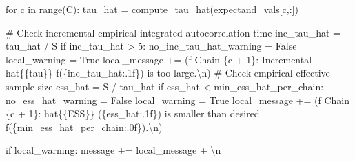 \documentclass[
  letterpaper,
  DIV=11,
  numbers=noendperiod]{scrartcl}
\newenvironment{Shaded}{\begin{snugshade}}{\end{snugshade}}
\newcommand{\BuiltInTok}[1]{\textcolor[rgb]{0.00,0.23,0.31}{#1}}
\newcommand{\CharTok}[1]{\textcolor[rgb]{0.13,0.47,0.30}{#1}}
\newcommand{\CommentTok}[1]{\textcolor[rgb]{0.37,0.37,0.37}{#1}}
\newcommand{\ControlFlowTok}[1]{\textcolor[rgb]{0.00,0.23,0.31}{#1}}
\newcommand{\DecValTok}[1]{\textcolor[rgb]{0.68,0.00,0.00}{#1}}
\newcommand{\KeywordTok}[1]{\textcolor[rgb]{0.00,0.23,0.31}{#1}}
\newcommand{\NormalTok}[1]{\textcolor[rgb]{0.00,0.23,0.31}{#1}}
\newcommand{\OperatorTok}[1]{\textcolor[rgb]{0.37,0.37,0.37}{#1}}
\newcommand{\SpecialCharTok}[1]{\textcolor[rgb]{0.37,0.37,0.37}{#1}}
\newcommand{\SpecialStringTok}[1]{\textcolor[rgb]{0.13,0.47,0.30}{#1}}
\newcommand{\StringTok}[1]{\textcolor[rgb]{0.13,0.47,0.30}{#1}}
\newcommand{\VariableTok}[1]{\textcolor[rgb]{0.07,0.07,0.07}{#1}}
\begin{document}
\begin{Shaded}
\begin{Highlighting}[]
    \ControlFlowTok{for}\NormalTok{ c }\KeywordTok{in} \BuiltInTok{range}\NormalTok{(C):}
\NormalTok{      tau\_hat }\OperatorTok{=}\NormalTok{ compute\_tau\_hat(expectand\_vals[c,:])}

      \CommentTok{\# Check incremental empirical integrated autocorrelation time}
\NormalTok{      inc\_tau\_hat }\OperatorTok{=}\NormalTok{ tau\_hat }\OperatorTok{/}\NormalTok{ S}
      \ControlFlowTok{if}\NormalTok{ inc\_tau\_hat }\OperatorTok{\textgreater{}} \DecValTok{5}\NormalTok{:}
\NormalTok{        no\_inc\_tau\_hat\_warning }\OperatorTok{=} \VariableTok{False}
\NormalTok{        local\_warning }\OperatorTok{=} \VariableTok{True}
\NormalTok{        local\_message }\OperatorTok{+=}\NormalTok{ (}\SpecialStringTok{f\textquotesingle{}  Chain }\SpecialCharTok{\{}\NormalTok{c }\OperatorTok{+} \DecValTok{1}\SpecialCharTok{\}}\SpecialStringTok{: Incremental hat}\CharTok{\{\{}\SpecialStringTok{tau}\CharTok{\}\}}\SpecialStringTok{ \textquotesingle{}}
                          \SpecialStringTok{f\textquotesingle{}(}\SpecialCharTok{\{}\NormalTok{inc\_tau\_hat}\SpecialCharTok{:.1f\}}\SpecialStringTok{) is too large.}\CharTok{\textbackslash{}n}\SpecialStringTok{\textquotesingle{}}\NormalTok{)}
      \CommentTok{\# Check empirical effective sample size}
\NormalTok{      ess\_hat }\OperatorTok{=}\NormalTok{ S }\OperatorTok{/}\NormalTok{ tau\_hat}
      \ControlFlowTok{if}\NormalTok{ ess\_hat }\OperatorTok{\textless{}}\NormalTok{ min\_ess\_hat\_per\_chain:}
\NormalTok{        no\_ess\_hat\_warning }\OperatorTok{=} \VariableTok{False}
\NormalTok{        local\_warning }\OperatorTok{=} \VariableTok{True}
\NormalTok{        local\_message }\OperatorTok{+=}\NormalTok{ (}\SpecialStringTok{f\textquotesingle{}  Chain }\SpecialCharTok{\{}\NormalTok{c }\OperatorTok{+} \DecValTok{1}\SpecialCharTok{\}}\SpecialStringTok{: hat}\CharTok{\{\{}\SpecialStringTok{ESS}\CharTok{\}\}}\SpecialStringTok{ (}\SpecialCharTok{\{}\NormalTok{ess\_hat}\SpecialCharTok{:.1f\}}\SpecialStringTok{) \textquotesingle{}}
                          \StringTok{\textquotesingle{}is smaller than desired \textquotesingle{}}
                          \SpecialStringTok{f\textquotesingle{}(}\SpecialCharTok{\{}\NormalTok{min\_ess\_hat\_per\_chain}\SpecialCharTok{:.0f\}}\SpecialStringTok{).}\CharTok{\textbackslash{}n}\SpecialStringTok{\textquotesingle{}}\NormalTok{)}
    
    \ControlFlowTok{if}\NormalTok{ local\_warning:}
\NormalTok{      message }\OperatorTok{+=}\NormalTok{ local\_message }\OperatorTok{+} \StringTok{\textquotesingle{}}\CharTok{\textbackslash{}n}\StringTok{\textquotesingle{}}
  

\end{Highlighting}
\end{Shaded}
\end{document}
